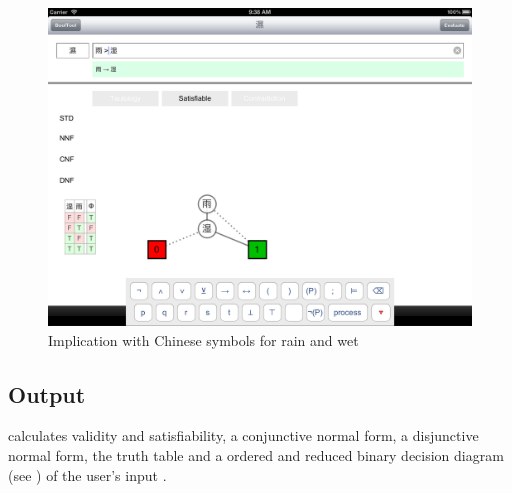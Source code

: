 \begin{figure}[htbp]
\begin{center}
\includegraphics[scale=0.18,trim=0 43cm 0cm 0, clip=true]{concept/RainHD.png}
\caption{Implication with Chinese symbols for rain and wet}
\label{fig:BoolToolChineseInput}
\end{center}
\end{figure}


\subsection{Output}

\BoolTool calculates validity and satisfiability, 
a conjunctive normal form, 
a disjunctive normal form, 
the truth table and a ordered and
reduced binary decision diagram 
(see ) of the user's input . 

